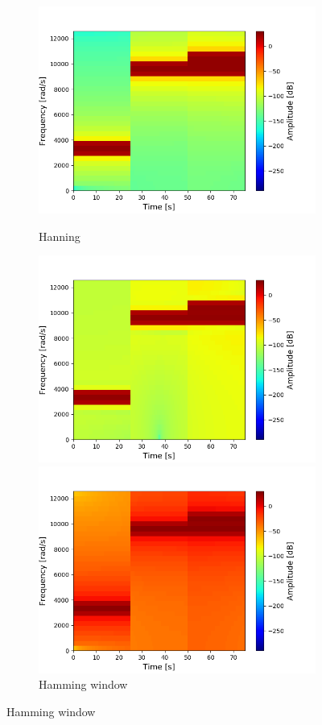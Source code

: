 \begin{figure}[H]
\centering
\begin{subfigure}{0.49\textwidth}
\centering
\includegraphics[width=\textwidth]{figures/stft_windows/100/hanning.png}
\caption{Hanning}
\label{fig:stft_hanning_100}
\includegraphics[width=\textwidth]{figures/stft_windows/100/hamming.png}
\caption{Hamming window}
\label{fig:stft_hamming_100}
\includegraphics[width=\textwidth]{figures/stft_windows/100/kaiser_4.png}

\end{subfigure}
\end{figure}
